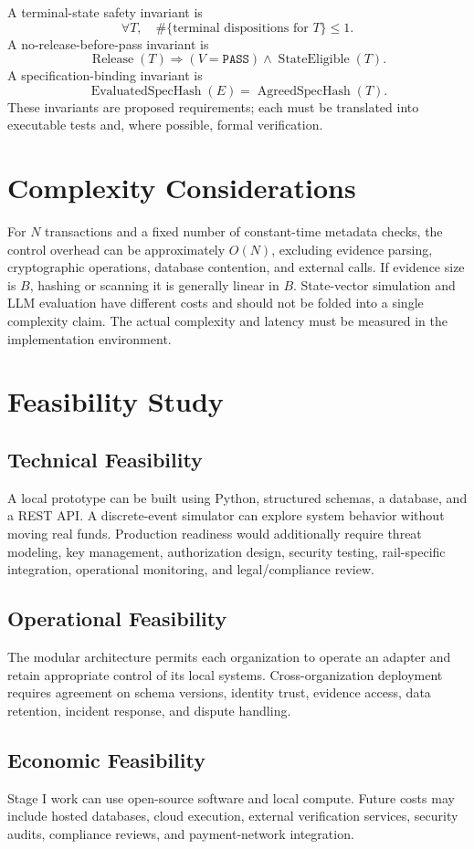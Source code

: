 \documentclass[12pt,a4paper,oneside]{report}
\begin{document}
A terminal-state safety invariant is
\[
\forall T,\quad \#\{\text{terminal dispositions for }T\}\leq 1.
\]
A no-release-before-pass invariant is
\[
\operatorname{Release}(T)\Rightarrow
(V=\texttt{PASS})\land\operatorname{StateEligible}(T).
\]
A specification-binding invariant is
\[
\operatorname{EvaluatedSpecHash}(E)=\operatorname{AgreedSpecHash}(T).
\]
These invariants are proposed requirements; each must be translated into executable tests and, where possible, formal verification.

\section{Complexity Considerations}
For $N$ transactions and a fixed number of constant-time metadata checks, the control overhead can be approximately $O(N)$, excluding evidence parsing, cryptographic operations, database contention, and external calls. If evidence size is $B$, hashing or scanning it is generally linear in $B$. State-vector simulation and LLM evaluation have different costs and should not be folded into a single complexity claim. The actual complexity and latency must be measured in the implementation environment.

\section{Feasibility Study}
\subsection{Technical Feasibility}
A local prototype can be built using Python, structured schemas, a database, and a REST API. A discrete-event simulator can explore system behavior without moving real funds. Production readiness would additionally require threat modeling, key management, authorization design, security testing, rail-specific integration, operational monitoring, and legal/compliance review.

\subsection{Operational Feasibility}
The modular architecture permits each organization to operate an adapter and retain appropriate control of its local systems. Cross-organization deployment requires agreement on schema versions, identity trust, evidence access, data retention, incident response, and dispute handling.

\subsection{Economic Feasibility}
Stage I work can use open-source software and local compute. Future costs may include hosted databases, cloud execution, external verification services, security audits, compliance reviews, and payment-network integration.
\end{document}
